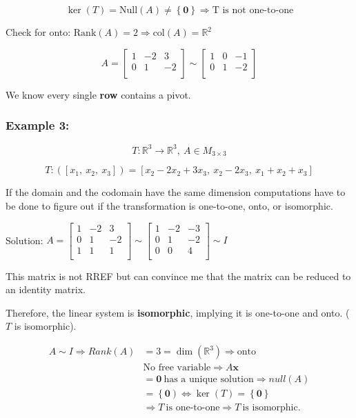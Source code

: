 \documentclass[12pt]{article}
\theoremstyle{plain}
\theoremstyle{remark}
\theoremstyle{definition}
\begin{document}
\[\ker(T) = \text{Null}(A) \neq \left\{ \mathbf{0} \right\} \Rightarrow \text{T\ is\ not\ one-to-one}\]

Check for onto:
\(\text{Rank}(A) = 2 \Rightarrow \text{col}(A) = \mathbb{R}^{2}\)

\[A = \begin{bmatrix}
1 & - 2 & 3 \\
0 & 1 & - 2 \\
\end{bmatrix}\sim\begin{bmatrix}
1 & 0 & - 1 \\
0 & 1 & - 2 \\
\end{bmatrix}\]

We know every single \textbf{row} contains a pivot.


\subsubsection{Example 3:}

\[T:\mathbb{R}^{3} \rightarrow \mathbb{R}^{3},\ A \in M_{3 \times 3}\]

\[{T:\left( \left\lbrack x_{1},\ x_{2},\ x_{3} \right\rbrack \right) }{= \left\lbrack x_{2} - 2x_{2} + 3x_{3},\ x_{2} - 2x_{3},\ x_{1} + x_{2} + x_{3} \right\rbrack} \]

If the domain and the codomain have the same dimension computations have
to be done to figure out if the transformation is one-to-one, onto, or
isomorphic.

Solution: \(A = \begin{bmatrix}
1 & - 2 & 3 \\
0 & 1 & - 2 \\
1 & 1 & 1 \\
\end{bmatrix}\sim\begin{bmatrix}
1 & - 2 & - 3 \\
0 & 1 & - 2 \\
0 & 0 & 4 \\
\end{bmatrix}\sim I\)

This matrix is not RREF but can convince me that the matrix can be
reduced to an identity matrix.

Therefore, the linear system is \textbf{isomorphic}, implying it is
one-to-one and onto. (\(T\) is isomorphic).

\begin{align*}
A\sim I \Rightarrow Rank(A) &= 3 = \dim\left( \mathbb{R}^{3} \right) \Rightarrow \text{onto} \\
&\text{No\ free\ variable} \Rightarrow A\mathbf{x}  \\
&= \mathbf{0}\ \text{has\ a\ unique\ solution} \Rightarrow null(A)  \\
&= \left\{ \mathbf{0} \right) \Leftrightarrow \ker(T) = \left\{ \mathbf{0} \right\}  \\
&\Rightarrow T\ \text{is\ one-to-one} \Rightarrow T\ \text{is\ isomorphic.}
\end{align*}
\end{document}
